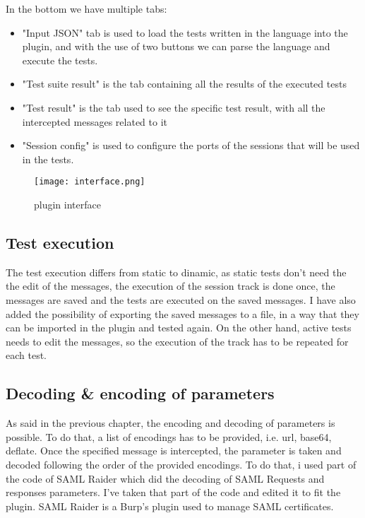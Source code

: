 In the bottom we have multiple tabs:
\begin{itemize}
    \item "Input JSON" tab is used to load the tests written in the language into the plugin, and with the use of two buttons we can parse the language and execute the tests.
    \item "Test suite result" is the tab containing all the results of the executed tests
    \item "Test result" is the tab used to see the specific test result, with all the intercepted messages related to it
    \item "Session config" is used to configure the ports of the sessions that will be used in the tests.
\end{itemize}

\begin{figure}
    \texttt{[image: interface.png]}
    \caption{plugin interface}
    \label{fig:plugin_interface}
\end{figure}

\subsection{Test execution}
The test execution differs from static to dinamic, as static tests don't need the the edit of the messages, the execution of the \gls{session track} is done once, the messages are saved and the tests are executed on the saved messages. I have also added the possibility of exporting the saved messages to a file, in a way that they can be imported in the plugin and tested again.
On the other hand, active tests needs to edit the messages, so the execution of the track has to be repeated for each test.

\subsection{Decoding \& encoding of parameters}
As said in the previous chapter, the encoding and decoding of parameters is possible. To do that, a list of encodings has to be provided, i.e. url, base64, deflate. Once the specified message is intercepted, the parameter is taken and decoded following the order of the provided encodings. To do that, i used part of the code of SAML Raider \cite{saml_raider} which did the decoding of SAML Requests and responses parameters. I've taken that part of the code and edited it to fit the plugin. SAML Raider is a Burp's plugin used to manage SAML certificates.

